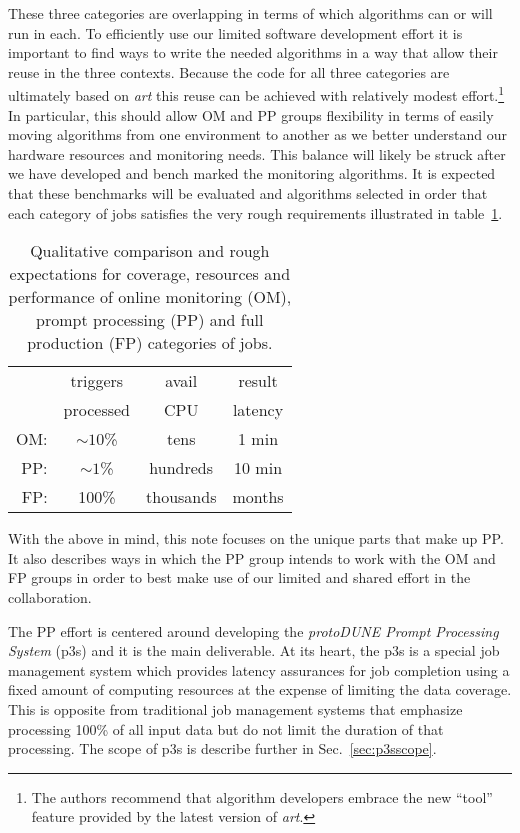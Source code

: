 \documentclass[pdftex,12pt,letter]{article}
\newcommand{\pd}{protoDUNE\xspace}
\begin{document}
These three categories are overlapping in terms of which algorithms
can or will run in each.  To efficiently use our limited software
development effort it is important to find ways to write the needed
algorithms in a way that allow their reuse in the three contexts.
Because the code for all three categories are ultimately based on
\textit{art} this reuse can be achieved with relatively modest
effort.\footnote{The authors recommend that algorithm developers
  embrace the new ``tool'' feature provided by the latest version of
  \textit{art}.}  In particular, this should allow OM and PP groups
flexibility in terms of easily moving algorithms from one environment
to another as we better understand our hardware resources and
monitoring needs.  This balance will likely be struck after we have
developed and bench marked the monitoring algorithms.  It is expected
that these benchmarks will be evaluated and algorithms selected in
order that each category of jobs satisfies the very rough requirements
illustrated in table~\ref{tab:contexts}.

\begin{table}[h]
  \centering
  \begin{tabular}[h]{r|ccc}
    & triggers & avail & result \\
    & processed &  CPU & latency \\
    \hline
    OM: & $\sim 10$\% & tens & 1 min \\
    PP: & $\sim 1$\% & hundreds & 10 min \\
    FP: & 100\% & thousands & months \\
  \end{tabular}
  \caption{Qualitative comparison and rough expectations for coverage, resources and performance of online monitoring (OM), prompt processing (PP) and full production (FP) categories of jobs.}
  \label{tab:contexts}
\end{table}


With the above in mind, this note focuses on the unique parts that
make up PP.  It also describes ways in which the PP group intends to
work with the OM and FP groups in order to best make use of our
limited and shared effort in the collaboration.

The PP effort is centered around developing the \textit{\pd Prompt
  Processing System} (p3s) and it is the main deliverable.  At its
heart, the p3s is a special job management system which provides
latency assurances for job completion using a fixed amount of
computing resources at the expense of limiting the data coverage.
This is opposite from traditional job management systems that
emphasize processing 100\% of all input data but do not limit the
duration of that processing.  The scope of p3s is describe further in
Sec.~\ref{sec:p3sscope}.
\end{document}
